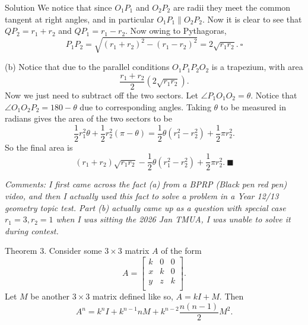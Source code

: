 \documentclass{article}
\begin{document}
\begin{solution}{Solution}
We notice that since $O_1 P_1$ and $O_2 P_2$ are radii they meet the
common tangent at right angles, and in particular $O_1 P_1 \parallel
O_2 P_2$. Now it is clear to see that $QP_2 = r_1 + r_2$ and $QP_1 =
r_1 - r_2$. Now owing to Pythagoras,
$$
P_1P_2 = \sqrt{(r_1 + r_2)^2 - (r_1 - r_2)^2} = 2\sqrt{r_1 r_2}.
\ \square
$$

(b) Notice that due to the parallel conditions $O_1P_1P_2O_2$ is a trapezium,
with area
$$
\frac{r_1 + r_2}{2}\left(2\sqrt{r_1 r_2}\right).
$$
Now we just need to subtract off the two sectors. Let
$\angle P_1 O_1 O_2 = \theta$. Notice that $\angle O_1 O_2 P_2 = 180 - \theta$ due
to corresponding angles. Taking $\theta$ to be measured in radians gives the
area of the two sectors to be
$$
\frac12 r_1^2 \theta + \frac12 r_2^2 (\pi - \theta) =
\frac12 \theta \left(r_1^2 - r_2^2\right) + \frac12 \pi r_2^2.
$$
So the final area is
$$
(r_1 + r_2)\sqrt{r_1 r_2} - \frac12 \theta \left(r_1^2 - r_2^2\right) +
\frac12 \pi r_2^2. \ \blacksquare
$$

\textit{Comments: I first came across the fact (a) from a BPRP
(Black pen red pen) video, and then I actually used this fact to solve a problem
in a Year 12/13 geometry topic test. Part (b) actually came up as a question
with special case $r_1 = 3, r_2 = 1$ when
I was sitting the 2026 Jan TMUA, I was unable to solve it during contest.}
\end{solution}
\newpage

\begin{problem}{Theorem 3.}
Consider some $3 \times 3$ matrix $A$ of the form
$$
A = \begin{bmatrix}
k & 0 & 0 \\
x & k & 0 \\
y & z & k \\
\end{bmatrix}.
$$
Let $M$ be another $3\times 3$ matrix defined like so, $A = kI + M$.
Then
$$
A^n = k^{n}I + k^{n-1} n M + k^{n-2}\frac{n(n-1)}{2}M^2.
$$
\end{problem}
\end{document}
